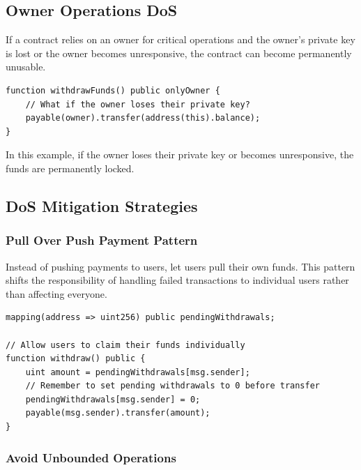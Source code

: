 \documentclass[12pt]{article}
\begin{document}
\subsection{Owner Operations DoS}

If a contract relies on an owner for critical operations and the owner's
private key is lost or the owner becomes unresponsive, the contract can become
permanently unusable.

\noindent
\begin{minipage}{\textwidth}
    \begin{lstlisting}[language=Solidity, caption=Owner Operations DoS Example]
function withdrawFunds() public onlyOwner {
    // What if the owner loses their private key?
    payable(owner).transfer(address(this).balance);
}
\end{lstlisting}
\end{minipage}

\noindent
In this example, if the owner loses their private key or becomes unresponsive, the funds are permanently locked.

\subsection{DoS Mitigation Strategies}

\subsubsection*{Pull Over Push Payment Pattern}

Instead of pushing payments to users, let users pull their own funds. This
pattern shifts the responsibility of handling failed transactions to individual users
rather than affecting everyone.

\noindent
\begin{minipage}{\textwidth}
    \begin{lstlisting}[language=Solidity, caption=Pull Over Push Example]
mapping(address => uint256) public pendingWithdrawals;

// Allow users to claim their funds individually
function withdraw() public {
    uint amount = pendingWithdrawals[msg.sender];
    // Remember to set pending withdrawals to 0 before transfer
    pendingWithdrawals[msg.sender] = 0;
    payable(msg.sender).transfer(amount);
}
\end{lstlisting}
\end{minipage}

\subsubsection*{Avoid Unbounded Operations}
\end{document}

